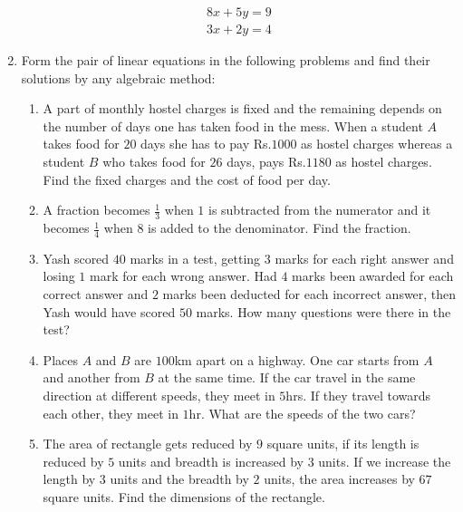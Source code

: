 \documentclass{article}
\theoremstyle{remark}
\begin{document}
\begin{enumerate}
\begin{align}
8x+5y=9
\\ 3x+2y=4
\end{align}
\item Form the pair of linear equations in the following problems and find their solutions by any algebraic method:
\begin{enumerate}[label=(\roman*)]
\item A part of monthly hostel charges is fixed and the remaining depends on the number of days one has taken food in the mess. When a student $A$ takes food for $20$ days she has to pay Rs.$1000$ as hostel charges whereas a student $B$ who takes food for $26$ days, pays Rs.$1180$ as hostel charges. Find the fixed charges and the cost of food per day.
\item A fraction becomes $\frac{1}{3}$ when $1$ is subtracted from the numerator and it becomes $\frac{1}{4}$ when $8$ is added to the denominator. Find the fraction.
\item Yash scored $40$ marks in a test, getting $3$ marks for each right answer and losing $1$ mark for each wrong answer. Had $4$ marks been awarded for each correct answer and $2$ marks been deducted for each incorrect answer, then Yash would have scored $50$ marks. How many questions were there in the test?
\item Places $A$ and $B$ are $100$km apart on a highway. One car starts from $A$ and another from $B$ at the same time. If the car travel in the same direction at different speeds, they meet in $5$hrs. If they travel towards each other, they meet in $1$hr. What are the speeds of the two cars?
\item The area of rectangle gets reduced by $9$ square units, if its length is reduced by $5$ units and breadth is increased by $3$ units. If we increase the length by $3$ units and the breadth by $2$ units, the area increases by $67$ square units. Find the dimensions of the rectangle.
\end{enumerate}
\end{enumerate}
\end{document}
